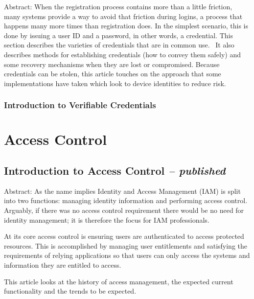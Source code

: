 Abstract: When the registration process contains more than a little
friction, many systems provide a way to avoid that friction during
logins, a process that happens many more times than registration does.
In the simplest scenario, this is done by issuing a user ID and a
password, in other words, a credential. This section describes the
varieties of credentials that are in common use.~ It also describes
methods for establishing credentials (how to convey them safely) and
some recovery mechanisms when they are lost or compromised. Because
credentials can be stolen, this article touches on the approach that
some implementations have taken which look to device identities to
reduce risk.

\hypertarget{introduction-to-verifiable-credentials}{%
\subsection{Introduction to Verifiable
Credentials}\label{introduction-to-verifiable-credentials}}

\hypertarget{access-control}{%
\chapter{Access Control}\label{access-control}}

\hypertarget{introduction-to-access-control-published}{%
\section{\texorpdfstring{Introduction to Access Control \emph{--
published}}{Introduction to Access Control -- published}}\label{introduction-to-access-control-published}}

Abstract: As the name implies Identity and Access Management (IAM) is
split into two functions: managing identity information and performing
access control. Arguably, if there was no access control requirement
there would be no need for identity management; it is therefore the
focus for IAM professionals.

At its core access control is ensuring users are authenticated to access
protected resources. This is accomplished by managing user entitlements
and satisfying the requirements of relying applications so that users
can only access the systems and information they are entitled to access.

This article looks at the history of access management, the expected
current functionality and the trends to be expected.

